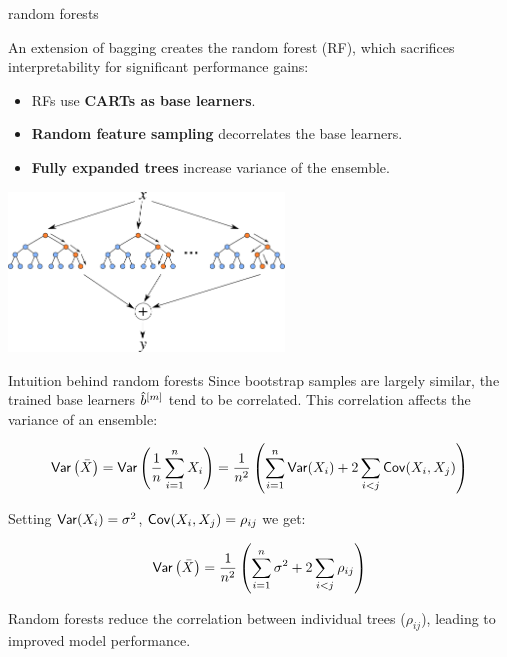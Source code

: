 \documentclass[11pt,compress,t,notes=noshow, xcolor=table]{beamer}
\begin{document}
\begin{vbframe}{random forests }

An extension of bagging creates the random forest (RF), which sacrifices interpretability for significant performance gains:

\begin{itemize}
\item RFs use \textbf{CARTs as base learners}. %
\item \textbf{Random feature sampling} decorrelates the base learners.
\item \textbf{Fully expanded trees} increase variance of the ensemble.
\end{itemize}

\begin{center}
\includegraphics[width=0.55\textwidth]{figure_man/forest.png}
\end{center}

\end{vbframe}


\begin{vbframe}{Intuition behind random forests}
Since bootstrap samples are largely similar, the trained base learners $\hat{b}^{[m]}$ tend to be correlated. This correlation affects the variance of an ensemble:

$$
\mathsf{Var}\left(\bar{X}\right) = \mathsf{Var}\left(\frac{1}{n} \sum_{i=1}^{n} X_i \right) = \frac{1}{n^2} \left( \sum_{i=1}^{n} \mathsf{Var}(X_i) + 2 \sum_{i < j} \mathsf{Cov}(X_i, X_j) \right)
$$

Setting $\mathsf{Var}(X_i) = \sigma^2$, $\mathsf{Cov}(X_i, X_j) = \rho_{ij}$ we get:

$$
\mathsf{Var}\left(\bar{X}\right) = \frac{1}{n^2} \left( \sum_{i=1}^{n} \sigma^2 + 2 \sum_{i < j} \rho_{ij} \right)
$$

Random forests reduce the correlation between individual trees ($\rho_{ij}$), leading to improved model performance.
\end{vbframe}
\end{document}
